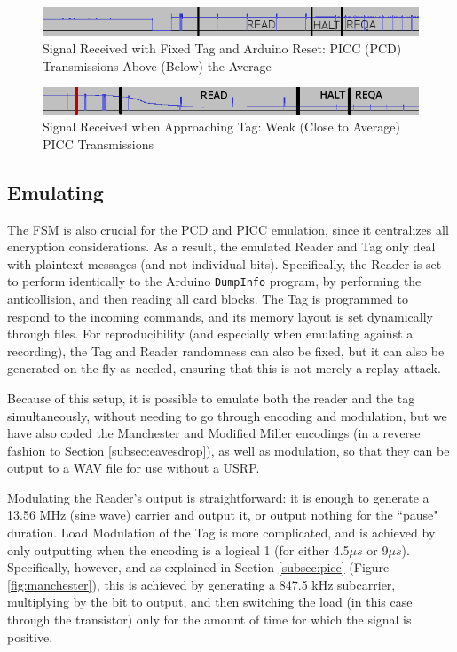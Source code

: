 \documentclass[fleqn,10pt]{SelfArx} %
\newcommand{\ms}{\ensuremath{\mu s} }
\begin{document}
\begin{figure}[tp]
  \includegraphics[width=\linewidth]{img/usrpreset}
  \caption{Signal Received with Fixed Tag and Arduino Reset: PICC (PCD) Transmissions Above (Below) the Average}
  \label{fig:usrpreset}
\end{figure}

\begin{figure}[tp]
  \includegraphics[width=\linewidth]{img/usrpreal}
  \caption{Signal Received when Approaching Tag: Weak (Close to Average) PICC Transmissions}
  \label{fig:usrpreal}
\end{figure}


\subsection{Emulating}
\label{subsec:emulate}

The FSM is also crucial for the PCD and PICC emulation, since it centralizes all encryption considerations. As a result, the emulated Reader and Tag only deal with plaintext messages (and not individual bits). Specifically, the Reader is set to perform identically to the Arduino \texttt{DumpInfo} program, by performing the anticollision, and then reading all card blocks. The Tag is programmed to respond to the incoming commands, and its memory layout is set dynamically through files. For reproducibility (and especially when emulating against a recording), the Tag and Reader randomness can also be fixed, but it can also be generated on-the-fly as needed, ensuring that this is not merely a replay attack.

Because of this setup, it is possible to emulate both the reader and the tag simultaneously, without needing to go through encoding and modulation, but we have also coded the Manchester and Modified Miller encodings (in a reverse fashion to Section \ref{subsec:eavesdrop}), as well as modulation, so that they can be output to a WAV file for use without a USRP.

Modulating the Reader's output is straightforward: it is enough to generate a 13.56 MHz (sine wave) carrier and output it, or output nothing for the ``pause" duration. Load Modulation of the Tag is more complicated, and is achieved by only outputting when the encoding is a logical 1 (for either 4.5\ms or 9$\mu s$). Specifically, however, and as explained in Section \ref{subsec:picc} (Figure \ref{fig:manchester}), this is achieved by generating a 847.5 kHz subcarrier, multiplying by the bit to output, and then switching the load (in this case through the transistor) only for the amount of time for which the signal is positive.
\end{document}
